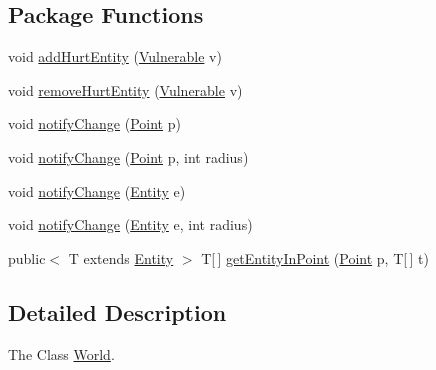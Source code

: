 \subsection*{Package Functions}
\begin{DoxyCompactItemize}
\item 
void \hyperlink{classjdungeon_1_1core_1_1world_1_1_world_a87ba45ab8e3980e192655a0d99645e3e}{addHurtEntity} (\hyperlink{classjdungeon_1_1core_1_1world_1_1_vulnerable}{Vulnerable} v)
\item 
void \hyperlink{classjdungeon_1_1core_1_1world_1_1_world_a3e93c0a5378e46a0e408810368927040}{removeHurtEntity} (\hyperlink{classjdungeon_1_1core_1_1world_1_1_vulnerable}{Vulnerable} v)
\item 
void \hyperlink{classjdungeon_1_1core_1_1world_1_1_world_a0a866cdfd25ddff71c49d8fc0486a96b}{notifyChange} (\hyperlink{classjdungeon_1_1core_1_1world_1_1_point}{Point} p)
\item 
void \hyperlink{classjdungeon_1_1core_1_1world_1_1_world_aea5bb0068ff3c20827be95bd061e43fb}{notifyChange} (\hyperlink{classjdungeon_1_1core_1_1world_1_1_point}{Point} p, int radius)
\item 
void \hyperlink{classjdungeon_1_1core_1_1world_1_1_world_aeea974d8cdf4f908836b6b40ad72b7e3}{notifyChange} (\hyperlink{classjdungeon_1_1core_1_1world_1_1_entity}{Entity} e)
\item 
void \hyperlink{classjdungeon_1_1core_1_1world_1_1_world_a4dcd961470e7c74490c65bd5f87844ad}{notifyChange} (\hyperlink{classjdungeon_1_1core_1_1world_1_1_entity}{Entity} e, int radius)
\item 
public$<$ T extends \hyperlink{classjdungeon_1_1core_1_1world_1_1_entity}{Entity} $>$ T\mbox{[}$\,$\mbox{]} \hyperlink{classjdungeon_1_1core_1_1world_1_1_world_a6208d22fa4bb88ab3f77eb8eac6bffce}{getEntityInPoint} (\hyperlink{classjdungeon_1_1core_1_1world_1_1_point}{Point} p, T\mbox{[}$\,$\mbox{]} t)
\end{DoxyCompactItemize}


\subsection{Detailed Description}
The Class \hyperlink{classjdungeon_1_1core_1_1world_1_1_world}{World}. 

